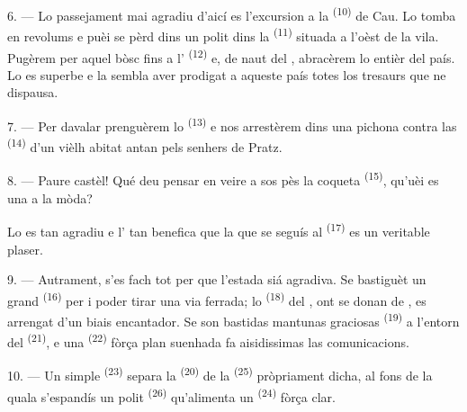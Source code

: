 \VUsaut{3.0mm}
\VUsaut{3.0mm}

6. --- Lo passejament mai agradiu d'aicí es l'excursion a la 
\textsuperscript{(10)} de Cau. Lo  tomba en revolums e puèi se
pèrd dins un polit  dins la  \textsuperscript{(11)}
situada a l'oèst de la vila. Pugèrem per aquel bòsc fins a l' \textsuperscript{(12)} e, de naut del ,
abracèrem lo  entièr del país. Lo  es superbe e
la  sembla aver prodigat a aqueste país totes los tresaurs que ne
dispausa.

7. --- Per davalar prenguèrem lo  \textsuperscript{(13)} e nos
arrestèrem dins una pichona  contra las 
\textsuperscript{(14)} d'un vièlh  abitat antan pels
senhers de Pratz.

8. --- Paure castèl! Qué deu pensar en veire a sos pès la coqueta  \textsuperscript{(15)}, qu'uèi es una  a la
mòda?

Lo  es tan agradiu e l' tan benefica que la
 que se seguís al  \textsuperscript{(17)} es un
veritable plaser.

\VUsaut{3.0mm}
\VUsaut{3.0mm}

9. --- Autrament, s'es fach tot per que l'estada siá agradiva. Se bastiguèt un
grand  \textsuperscript{(16)} per i poder tirar una via ferrada;
lo  \textsuperscript{(18)} del , ont se
donan de , es arrengat d'un biais encantador. Se son bastidas
mantunas graciosas  \textsuperscript{(19)} a l'entorn del
 \textsuperscript{(21)}, e una 
\textsuperscript{(22)} fòrça plan suenhada fa aisidissimas las comunicacions.

10. --- Un simple  \textsuperscript{(23)} separa la 
\textsuperscript{(20)} de la  \textsuperscript{(25)} pròpriament
dicha, al fons de la quala s'espandís un polit 
\textsuperscript{(26)} qu'alimenta un  \textsuperscript{(24)} fòrça
clar.

